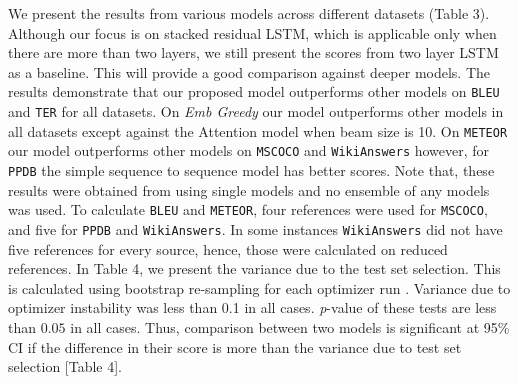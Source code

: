 We present the results from various models across different datasets (Table 3). Although our focus is on stacked residual LSTM, which is applicable only when there are more than two layers, we still present the scores from two layer LSTM as a baseline. This will provide a good comparison against deeper models. The results demonstrate that our proposed model outperforms other models on \texttt{BLEU}  and \texttt{TER} for all datasets. On \emph{Emb Greedy} our model outperforms other models in all datasets except against the Attention model when beam size is 10. On \texttt{METEOR} our model outperforms other models on \texttt{MSCOCO} and \texttt{WikiAnswers} however, for \texttt{PPDB} the simple sequence to sequence model has better scores. Note that, these results were obtained from using single models and no ensemble of any models was used. To calculate \texttt{BLEU} and \texttt{METEOR}, four references were used for \texttt{MSCOCO}, and five for \texttt{PPDB} and \texttt{WikiAnswers}. In some instances \texttt{WikiAnswers} did not have five references for every source, hence, those were calculated on reduced references. In Table 4, we present the variance due to the test set selection. This is calculated using bootstrap re-sampling for each optimizer run \cite{Clark:2011}. Variance due to optimizer instability was less than 0.1 in all cases. {\it p}-value of these tests are less than $0.05$ in all cases. Thus, comparison between two models is significant at 95\% CI if the difference in their score is more than the variance due to test set selection [Table 4].
 
